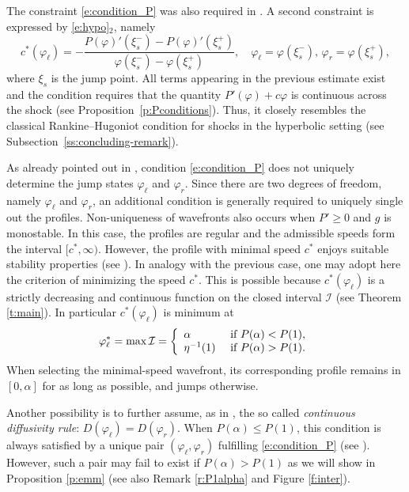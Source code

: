 \documentclass[11pt,a4paper]{article}
\renewcommand{\phi}{\varphi}
\begin{document}
The constraint \eqref{e:condition_P} was also required in \cite{Li2021, MTMWBH2}. A second constraint is expressed by \eqref{e:hypo}$_2$, namely
\begin{equation}\label{e:speed}
c^*(\phi_\ell)=-\frac{\displaystyle P(\varphi)'(\xi_s^-)-P(\phi)'(\xi_s^+)}{\phi(\xi_s^-)-\phi(\xi_s^+)}, \quad \phi_\ell=\phi(\xi_s^-), \, \phi_r= \phi(\xi_s^+),
\end{equation}
where $\xi_s$ is the jump point. All terms appearing in the previous estimate exist and the condition requires that the quantity $P'(\varphi) + c\varphi$ is continuous  across the shock (see Proposition~\ref{p:Pconditions}). Thus, it closely resembles the classical Rankine–Hugoniot condition for shocks in the hyperbolic setting (see Subsection~\ref{ss:concluding-remark}).

As already pointed out in \cite{Li2021, MTMWBH2}, condition \eqref{e:condition_P} does not uniquely determine the jump states $\phi_\ell$ and $\phi_r$. Since there are two degrees of freedom, namely $\phi_\ell$ and $\phi_r$,  an additional condition is generally required to uniquely single out the profiles.
Non-uniqueness of wavefronts also occurs when $P'\ge 0$ and $g$ is monostable. In this case, the profiles are regular and the admissible speeds form the interval $[c^*, \infty)$. However, the profile with minimal speed $c^*$ enjoys suitable stability properties (see \cite[\S 4.5]{Aronson-Weinberger}). In analogy with the previous case, one may adopt here the criterion of minimizing the speed $c^*$. This is possible because $c^*(\phi_\ell)$ is a strictly decreasing and continuous function on the closed interval $\mathcal{I}$ (see Theorem \ref{t:main}).
In particular  $c^*(\phi_{\ell})$  is minimum at 
\[
\phi_\ell^*=\max\mathcal{I}
=
\left\{
\begin{array}{ll}
\alpha & \hbox{ if }P(\alpha)<P(1),
\\
\eta^{-1}(1)
& \hbox{ if } P(\alpha)>P(1).
\end{array}
\right.
\]
When selecting the minimal-speed wavefront, its corresponding profile remains in $[0,\alpha]$ for as long as possible, and jumps otherwise.

\noindent Another possibility is to further  assume, as in \cite{MTMWBH2}, the so called \emph{continuous diffusivity rule}: $D(\phi_{\ell})=D(\phi_r)$. When $P(\alpha)\le P(1)$, this condition is always satisfied by a unique pair $(\phi_{\ell}, \phi_r)$ fulfilling \eqref{e:condition_P} (see \cite[Proposition 2]{MTMWBH2}). However, such a pair may fail to exist if  $P(\alpha)> P(1)$ as we will show in Proposition \ref{p:emm} (see also Remark \ref{r:P1alpha} and Figure  \ref{f:inter}).
\end{document}
